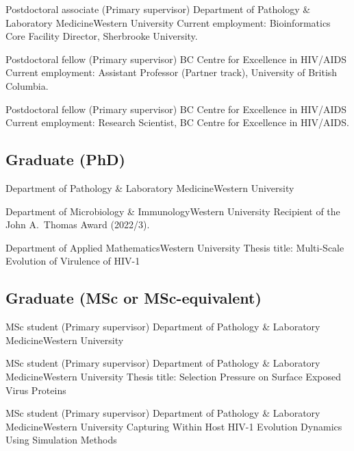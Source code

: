 {Postdoctoral associate (Primary supervisor)}
{Department of Pathology \& Laboratory Medicine}{Western University}
{Current employment: Bioinformatics Core Facility Director, Sherbrooke University.}

{Postdoctoral fellow (Primary supervisor)}
{BC Centre for Excellence in HIV/AIDS}{}
{Current employment: Assistant Professor (Partner track), University of British Columbia.}

{Postdoctoral fellow (Primary supervisor)}
{BC Centre for Excellence in HIV/AIDS}{}
{Current employment: Research Scientist, BC Centre for Excellence in HIV/AIDS.}



\subsection {Graduate (PhD)}

{Department of Pathology \& Laboratory Medicine}{Western University}
{}

{Department of Microbiology \& Immunology}{Western University}
{Recipient of the John A.~Thomas Award (2022/3).}

{Department of Applied Mathematics}{Western University}
{Thesis title: Multi-Scale Evolution of Virulence of HIV-1}



\subsection {Graduate (MSc or MSc-equivalent)}

{MSc student (Primary supervisor)}
{Department of Pathology \& Laboratory Medicine}{Western University}
{}

{MSc student (Primary supervisor)}
{Department of Pathology \& Laboratory Medicine}{Western University}
{Thesis title: Selection Pressure on Surface Exposed Virus Proteins}

{MSc student (Primary supervisor)}
{Department of Pathology \& Laboratory Medicine}{Western University}
{Capturing Within Host HIV-1 Evolution Dynamics Using Simulation Methods}

